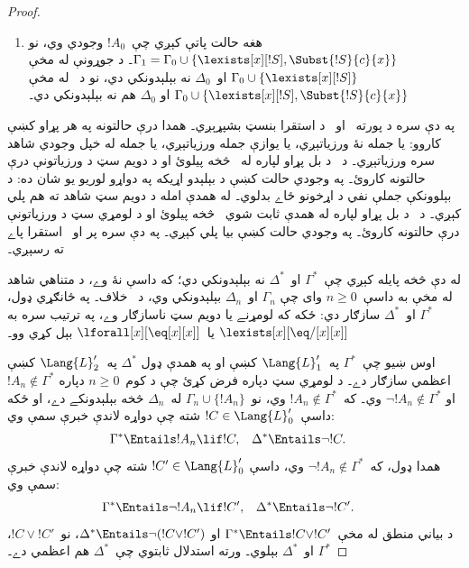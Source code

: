\documentclass[../../../include/open-logic-section]{subfiles}
\begin{document}
\begin{proof}
\begin{enumerate}
  او~$\Delta_0$ د جوړونې له مخې نه بېلېدونکي دي؛
\item هغه حالت پاتې کېږي چې~$!A_0$ وجودي وي، نو
  $\Gamma_1 = \Gamma_0 \cup \{ \lexists[x][!S],
  \Subst{!S}{c}{x} \}$۔ د جوړونې له مخې
  $\Gamma_0 \cup \{ \lexists[x][!S]\}$ او~$\Delta_0$ نه
  بېلېدونکي دي، نو د~ له مخې
  $\Gamma_0 \cup \{ \lexists[x][!S], \Subst{!S}{c}{x} \}$ او
  $\Delta_0$ هم نه بېلېدونکي دي۔
\end{enumerate}
په دې سره د پورته~ او~ د استقرا بنسټ
بشپړېږي۔ همدا درې حالتونه په هر پړاو کښې کاروو: يا جمله نۀ ورزياتېږي، يا يوازې جمله ورزياتېږي، يا جمله له خپل وجودي شاهد سره ورزياتېږي۔ د~ د بل پړاو لپاره له~ څخه پيلوئ او
د دويم سټ د ورزياتونې درې حالتونه کاروئ۔ په وجودي حالت کښې د بېلېدو اړيکه په دواړو لوريو يو شان ده: د بېلوونکې جملې نفي د اړخونو ځاے بدلوي۔ له همدې امله  د دويم سټ شاهد ته هم پلي کېږي۔
د~ د بل پړاو لپاره له همدې ثابت شوي~ څخه پيلوئ او د لومړي سټ د ورزياتونې درې حالتونه کاروئ۔ په وجودي حالت کښې بيا  پلي کېږي۔
په دې سره پر  او~ استقرا پاے ته رسېږي۔

له دې څخه پايله کېږي چې~$\Gamma^*$ او~$\Delta^*$ نه بېلېدونکي دي؛
که داسې نۀ وے، د متناهي شاهد له مخې به داسې~$n \ge 0$ وای چې
$\Gamma_n$ او~$\Delta_n$ بېلېدونکي وي، د~ خلاف۔ په
ځانګړي ډول، $\Gamma^*$ او~$\Delta^*$ سازګار دي: ځکه که لومړنے يا
دويم سټ ناسازګار وے، په ترتيب سره به
$\lexists[x][\eq/[x][x]]$ يا~$\lforall[x][\eq[x][x]]$ بېل کړي وو۔

اوس ښيو چې~$\Gamma^*$ په~$\Lang{L}'_1$ کښې او په همدې ډول
$\Delta^*$ په~$\Lang{L}'_2$ کښې اعظمي سازګار دے۔ د لومړي سټ دپاره
فرض کړئ چې د کوم~$n \ge 0$ دپاره $!A_n \notin \Gamma^*$ او
$\lnot !A_n \notin \Gamma^*$ وي۔ که~$!A_n \notin \Gamma^*$ وي،
نو~$\Gamma_n \cup \{!A_n \}$ له~$\Delta_n$ څخه بېلېدونکے دے، او
ځکه داسې~$!C \in \Lang{L}'_0$ شته چې دواړه لاندې خبرې سمې وي:
\begin{align*}
  \Gamma^* & \Entails !A_n \lif !C, &
  \Delta^* & \Entails \lnot !C.
\end{align*}
همدا ډول، که~$\lnot !A_n \notin \Gamma^*$ وي، داسې
$!C' \in \Lang{L}'_0$ شته چې دواړه لاندې خبرې سمې وي:
\begin{align*}
  \Gamma^* & \Entails \lnot !A_n \lif !C', &
  \Delta^* & \Entails \lnot !C'.
\end{align*}
د بياني منطق له مخې~$\Gamma^* \Entails !C \lor !C'$ او
$\Delta^* \Entails \lnot (!C \lor !C')$، نو~$!C \lor !C'$،
$\Gamma^*$ او~$\Delta^*$ بېلوي۔ ورته استدلال ثابتوي چې~$\Delta^*$
هم اعظمي دے۔


\end{proof}
\end{document}
